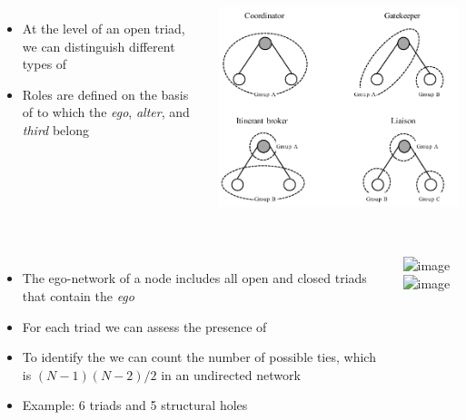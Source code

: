 \documentclass[8pt]{beamer}
\begin{document}
\begin{frame}
\frametitle{\insertsection}
\framesubtitle{\insertsubsection}

\begin{columns}

\begin{itemize}
\item At the level of an open triad, we can distinguish different types of {\color{blue}{brokerage roles}} \cite{Gould1989}
\item Roles are defined on the basis of {\color{blue}{groups}} to which the \textit{ego}, \textit{alter}, and \textit{third} belong
\end{itemize}

\centering
\includegraphics[width = \textwidth]{fernandez}
\end{columns}

\end{frame}


\begin{frame}
\frametitle{\insertsection}
\framesubtitle{\insertsubsection}

\begin{columns}
\begin{itemize}
	\item The ego-network of a node includes all open and closed triads that contain the \textit{ego}
	\item For each triad we can assess the presence of {\color{blue}{structural holes}}
	\item To identify the {\color{blue}{number of triads}} we can count the number of possible ties, which is $(N-1)(N-2)/2$ in an undirected network
	\item Example: 6 triads and 5 structural holes
\end{itemize}

\centering
\includegraphics<1>[width=5cm]{base}
\includegraphics<2>[width=5cm]{egonet}
\end{columns}

\end{frame}
\end{document}
